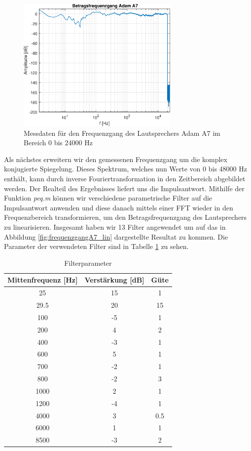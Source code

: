 \begin{figure}[H]
        \centering
        \includegraphics[width=0.7\textwidth]{Figures/frequenzgangA7.eps}
        \caption{Messdaten für den Frequenzgang des Lautsprechers Adam A7 im Bereich 0 bis 24000 Hz}
        \label{fig:frequenzgangA7}
\end{figure}

Als nächstes erweitern wir den gemessenen Frequenzgang um die komplex konjugierte Spiegelung. 
Dieses Spektrum, welches nun Werte von 0 bis 48000 Hz enthält, kann durch inverse Fouriertransformation in den Zeitbereich abgebildet werden.
Der Realteil des Ergebnisses liefert uns die Impulsantwort.
Mithilfe der Funktion \textit{peq.m} können wir verschiedene parametrische Filter auf die Impulsantwort anwenden und diese danach mittels einer FFT wieder in den Frequenzbereich transformieren, um den Betragsfrequenzgang des Lautsprechers zu linearisieren.
Insgesamt haben wir 13 Filter angewendet um auf das in Abbildung \ref{fig:frequenzgangA7_lin} dargestellte Resultat zu kommen.
Die Parameter der verwendeten Filter sind in Tabelle \ref{tab:filterparameter} zu sehen.

\begin{table}[H]
    \centering
    \caption{Filterparameter}
    \label{tab:filterparameter}
    \begin{tabular}{| c |c |c |}
    	\hline
        Mittenfrequenz [Hz] & Verstärkung [dB] & Güte\\
        \hline
        25 & 15 & 1 \\
		29.5 & 20 & 15 \\
		100 & -5 & 1\\
		200 & 4 & 2\\
		400 & -3 & 1 \\
		600 & 5 & 1\\
		700 &-2 & 1 \\
		800 & -2 & 3\\
		1000 & 2 & 1\\
		1200 & -4 & 1\\
		4000 & 3 & 0.5\\
		6000 & 1 & 1\\
		8500 & -3 & 2\\
        \hline
    \end{tabular}
\end{table}

